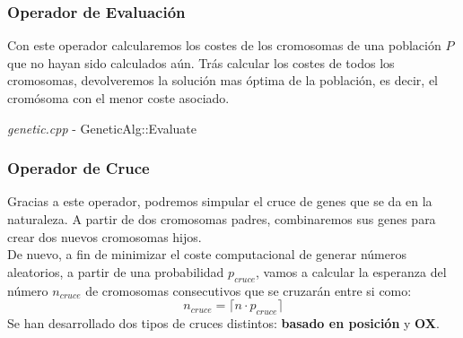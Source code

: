 \documentclass[a4paper, 12pt]{article}
\begin{document}
      \newpage
      \subsubsection*{Operador de Evaluación}
      Con este operador calcularemos los costes de los cromosomas de una población $P$ que no hayan sido calculados aún. Trás calcular los costes de todos los cromosomas, devolveremos la solución mas óptima de la población, es decir, el cromósoma con el menor coste asociado.
      \begin{algorithm}
       	\caption{\textit{genetic.cpp} - GeneticAlg::Evaluate}
       	
      \end{algorithm}
      
      
      \subsubsection*{Operador de Cruce}
      Gracias a este operador, podremos simpular el cruce de genes que se da en la naturaleza. A partir de dos cromosomas padres, combinaremos sus genes para crear dos nuevos cromosomas hijos.\\

	  De nuevo, a fin de minimizar el coste computacional de generar números aleatorios, a partir de una probabilidad $p_{cruce}$, vamos a calcular la esperanza del número $n_{cruce}$ de cromosomas consecutivos que se cruzarán entre si como:
      $$n_{cruce} = \lceil  n \cdot p_{cruce} \rceil$$
      Se han desarrollado dos tipos de cruces distintos: \textbf{basado en posición} y \textbf{OX}.
      
\end{document}
